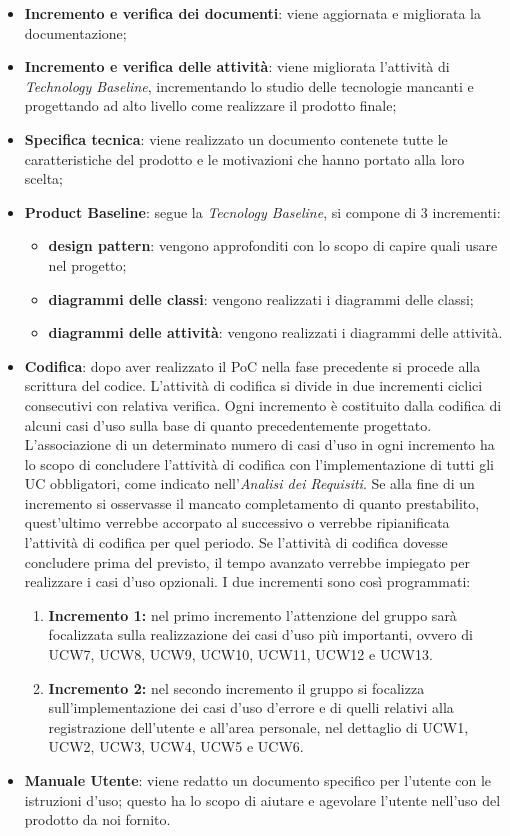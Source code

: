 \begin{itemize}
	\item \textbf{Incremento e verifica dei documenti}: viene aggiornata e migliorata la documentazione;
	\item \textbf{Incremento e verifica delle attività}: viene migliorata l’attività di \textit{Technology Baseline},  incrementando lo studio delle tecnologie mancanti e progettando ad alto livello come realizzare il prodotto finale;
	\item \textbf{Specifica tecnica}: viene realizzato un documento contenete tutte le caratteristiche del prodotto e le motivazioni che hanno portato alla loro scelta;
	\item \textbf{Product Baseline}: segue la \textit{Tecnology Baseline},  si compone di 3 incrementi:
		\begin{itemize}
			\item \textbf{design pattern}: vengono approfonditi con lo scopo di capire quali usare nel progetto;
			\item \textbf{diagrammi delle classi}: vengono realizzati i diagrammi delle classi;
			\item \textbf{diagrammi delle attività}: vengono realizzati i diagrammi delle attività.
		\end{itemize}
	\item \textbf{Codifica}: dopo aver realizzato il PoC nella fase precedente si procede alla scrittura del codice.  L'attività di codifica si divide in due incrementi ciclici consecutivi con relativa verifica.  Ogni incremento è costituito dalla codifica di alcuni casi d'uso sulla base di quanto precedentemente progettato.  L’associazione di un determinato numero di casi d’uso in ogni incremento ha lo scopo di concludere l'attività di codifica con l’implementazione di tutti gli UC obbligatori,  come indicato nell'\textit{Analisi dei Requisiti}.  Se alla fine di un incremento si osservasse il mancato completamento di quanto prestabilito,  quest’ultimo verrebbe accorpato al successivo o verrebbe ripianificata l’attività di codifica per quel periodo.  Se l'attività di codifica dovesse concludere prima del previsto,  il tempo avanzato verrebbe impiegato per realizzare i casi d'uso opzionali.  I due incrementi sono così programmati:
		\begin{enumerate}
			\item \textbf{Incremento 1:} nel primo incremento l'attenzione del gruppo sarà focalizzata sulla realizzazione dei casi d'uso più importanti,  ovvero di UCW7,  UCW8,  UCW9,  UCW10,  UCW11,  UCW12 e UCW13. 
			\item \textbf{Incremento 2:} nel secondo incremento il gruppo si focalizza sull'implementazione dei casi d'uso d'errore e di quelli relativi alla registrazione dell'utente e all'area personale,  nel dettaglio di UCW1,  UCW2,  UCW3,  UCW4,  UCW5 e UCW6.  
		\end{enumerate}
	\item \textbf{Manuale Utente}: viene redatto un documento specifico per l'utente con le istruzioni d'uso; questo ha lo scopo di aiutare e agevolare l’utente nell’uso del prodotto da noi fornito.
\end{itemize}

